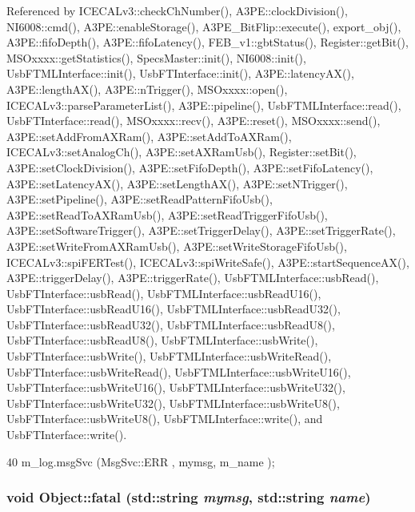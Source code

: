 Referenced by ICECALv3::checkChNumber(), A3PE::clockDivision(), NI6008::cmd(), A3PE::enableStorage(), A3PE\_\-BitFlip::execute(), export\_\-obj(), A3PE::fifoDepth(), A3PE::fifoLatency(), FEB\_\-v1::gbtStatus(), Register::getBit(), MSOxxxx::getStatistics(), SpecsMaster::init(), NI6008::init(), UsbFTMLInterface::init(), UsbFTInterface::init(), A3PE::latencyAX(), A3PE::lengthAX(), A3PE::nTrigger(), MSOxxxx::open(), ICECALv3::parseParameterList(), A3PE::pipeline(), UsbFTMLInterface::read(), UsbFTInterface::read(), MSOxxxx::recv(), A3PE::reset(), MSOxxxx::send(), A3PE::setAddFromAXRam(), A3PE::setAddToAXRam(), ICECALv3::setAnalogCh(), A3PE::setAXRamUsb(), Register::setBit(), A3PE::setClockDivision(), A3PE::setFifoDepth(), A3PE::setFifoLatency(), A3PE::setLatencyAX(), A3PE::setLengthAX(), A3PE::setNTrigger(), A3PE::setPipeline(), A3PE::setReadPatternFifoUsb(), A3PE::setReadToAXRamUsb(), A3PE::setReadTriggerFifoUsb(), A3PE::setSoftwareTrigger(), A3PE::setTriggerDelay(), A3PE::setTriggerRate(), A3PE::setWriteFromAXRamUsb(), A3PE::setWriteStorageFifoUsb(), ICECALv3::spiFERTest(), ICECALv3::spiWriteSafe(), A3PE::startSequenceAX(), A3PE::triggerDelay(), A3PE::triggerRate(), UsbFTMLInterface::usbRead(), UsbFTInterface::usbRead(), UsbFTMLInterface::usbReadU16(), UsbFTInterface::usbReadU16(), UsbFTMLInterface::usbReadU32(), UsbFTInterface::usbReadU32(), UsbFTMLInterface::usbReadU8(), UsbFTInterface::usbReadU8(), UsbFTMLInterface::usbWrite(), UsbFTInterface::usbWrite(), UsbFTMLInterface::usbWriteRead(), UsbFTInterface::usbWriteRead(), UsbFTMLInterface::usbWriteU16(), UsbFTInterface::usbWriteU16(), UsbFTMLInterface::usbWriteU32(), UsbFTInterface::usbWriteU32(), UsbFTMLInterface::usbWriteU8(), UsbFTInterface::usbWriteU8(), UsbFTMLInterface::write(), and UsbFTInterface::write().


\begin{DoxyCode}
40 { m_log.msgSvc (MsgSvc::ERR     , mymsg, m_name ); }
\end{DoxyCode}
\hypertarget{classObject_ae62acd3d09f716220f75f252dc38bc9a}{
\subsubsection[{fatal}]{\setlength{\rightskip}{0pt plus 5cm}void Object::fatal (std::string {\em mymsg}, \/  std::string {\em name})}}
\label{classObject_ae62acd3d09f716220f75f252dc38bc9a}


